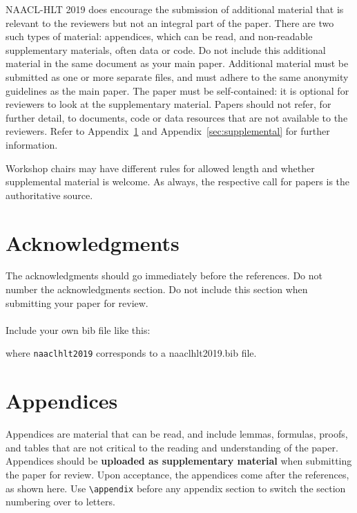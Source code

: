 \documentclass[11pt,a4paper]{article}
\begin{document}
NAACL-HLT 2019 does encourage the submission of additional material that is relevant to the reviewers but not an integral part of the paper. There are two such types of material: appendices, which can be read, and non-readable supplementary materials, often data or code.  Do not include this additional material in the same document as your main paper. Additional material must be submitted as one or more separate files, and must adhere to the same anonymity guidelines as the main paper. The paper must be self-contained: it is optional for reviewers to look at the supplementary material. Papers should not refer, for further detail, to documents, code or data resources that are not available to the reviewers. Refer to Appendix~\ref{sec:appendix} and Appendix~\ref{sec:supplemental} for further information. 

Workshop chairs may have different rules for allowed length and
whether supplemental material is welcome. As always, the respective
call for papers is the authoritative source.

\section*{Acknowledgments}

The acknowledgments should go immediately before the references.  Do
not number the acknowledgments section. Do not include this section
when submitting your paper for review. \\

 \\
Include your own bib file like this:
\verb||
\verb|| 

where \verb|naaclhlt2019| corresponds to a naaclhlt2019.bib file.



\appendix

\section{Appendices}
\label{sec:appendix}
Appendices are material that can be read, and include lemmas, formulas, proofs, and tables that are not critical to the reading and understanding of the paper. 
Appendices should be {\bf uploaded as supplementary material} when submitting the paper for review. Upon acceptance, the appendices come after the references, as shown here. Use
\verb|\appendix| before any appendix section to switch the section
numbering over to letters.
\end{document}
